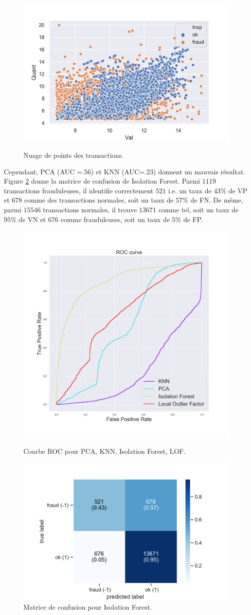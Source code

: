 \begin{figure}[H]
    \centering
    \includegraphics[width=.5\textwidth]{ADOA/Images/salescatter.png}
    \label{fig_sal11}
    \caption{Nuage de points des transactions.}%
\end{figure}
 \noindent Cependant, PCA (AUC =$.56$) et KNN (AUC=$.23$) donnent un mauvais résultat. Figure \ref{fig_sal13} donne la matrice de confusion de Isolation Forest. Parmi $1119$ transactions frauduleuses, il identifie correctement $521$ i.e. un taux de $ 43 \%$ de VP et $678$ comme des transactions normales, soit un taux de $ 57 \%$ de  FN. De même, parmi $15546$ transactions normales, il trouve $13671$ comme tel, soit un taux de $95 \%$ de VN  et $676$ comme frauduleuses,  soit un taux de $5 \%$ de FP. 
\begin{figure}[H]
    \includegraphics[width=.4\textwidth]{ADOA/Images/sales_roc.png}
     \caption{Courbe ROC pour PCA, KNN, Isolation Forest, LOF.}%
     \label{fig_sal14}
    \includegraphics[width=.5\textwidth]{ADOA/Images/sales_confusionmat.png}
  \caption{Matrice de confusion pour Isolation Forest.}
    \label{fig_sal13}
\end{figure}

